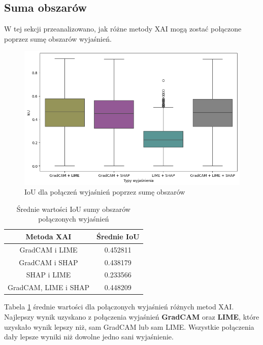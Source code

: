 \subsection*{Suma obszarów}
W tej sekcji przeanalizowano, jak różne metody XAI mogą zostać połączone poprzez sumę obszarów wyjaśnień.

\begin{figure}[h]
	\centering\includegraphics[width=.9\textwidth]{img/combine_iou_or}
	\caption{IoU dla połączeń wyjaśnień poprzez sumę obszarów}  \label{rys:combine_iou_or}
\end{figure}
\begin{table}[h]
	\centering
	\begin{tabular}{|c|c|}
		\hline
		\textbf{Metoda XAI}  & Średnie IoU \\
		\hline
		GradCAM i LIME       & 0.452811    \\
		\hline
		GradCAM i SHAP       & 0.438179    \\
		\hline
		SHAP i LIME          & 0.233566    \\
		\hline
		GradCAM, LIME i SHAP & 0.448209    \\
		\hline
	\end{tabular}
	\caption{Średnie wartości IoU sumy obszarów połączonych wyjaśnień}
	\label{tab:combineandiou}
\end{table}
Tabela \ref{tab:combineandiou} średnie wartości dla połączonych wyjaśnień różnych metod XAI.
Najlepszy wynik uzyskano z połączenia wyjaśnień \textbf{GradCAM} oraz \textbf{LIME}, które uzyskało wynik lepszy niż, sam GradCAM lub sam LIME.
Wszystkie połączenia dały lepsze wyniki niż dowolne jedno sani wyjaśnienie.

\vspace{1cm}

